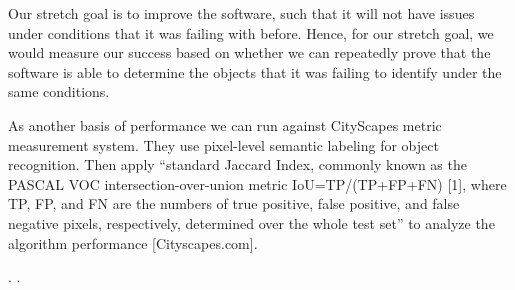 \documentclass[letterpaper,10pt]{article}
\begin{document}
Our stretch goal is to improve the software, such that it will not have issues under conditions that it was failing with before. Hence, for our stretch goal, we would measure our success based on whether we can repeatedly prove that the software is able to determine the objects that it was failing to identify under the same conditions.

As another basis of performance we can run against CityScapes metric measurement system. They use pixel-level semantic labeling for object recognition. Then apply “standard Jaccard Index, commonly known as the PASCAL VOC intersection-over-union metric IoU=TP/(TP+FP+FN) [1], where TP, FP, and FN are the numbers of true positive, false positive, and false negative pixels, respectively, determined over the whole test set” to analyze the algorithm performance [Cityscapes.com]. 

\newpage
\nocite{r1}. \nocite{r2}. \nocite{r3}


\end{document}
